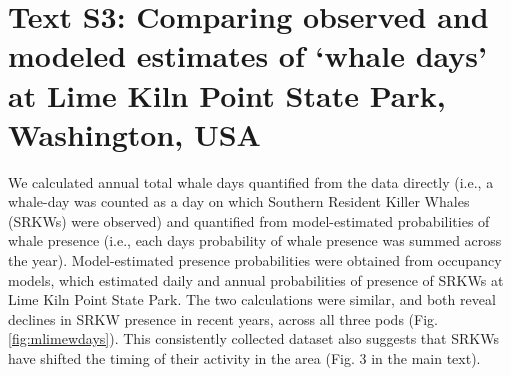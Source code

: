 \documentclass{article}
\begin{document}
\section* {Text S3: Comparing observed and modeled estimates of `whale days' at Lime Kiln Point State Park, Washington, USA}
\par We calculated annual total whale days quantified from the data directly (i.e., a whale-day was counted as a day on which Southern Resident Killer Whales (SRKWs) were observed) and quantified from model-estimated probabilities of whale presence (i.e., each days probability of whale presence was summed across the year). Model-estimated presence probabilities were obtained from occupancy models, which estimated daily and annual probabilities of presence of SRKWs at Lime Kiln Point State Park. The two calculations were similar, and both reveal declines in SRKW presence in recent years, across all three pods (Fig. \ref{fig:mlimewdays}). This consistently collected dataset also suggests that SRKWs have shifted the timing of their activity in the area (Fig. 3 in the main text).
\end{document}
